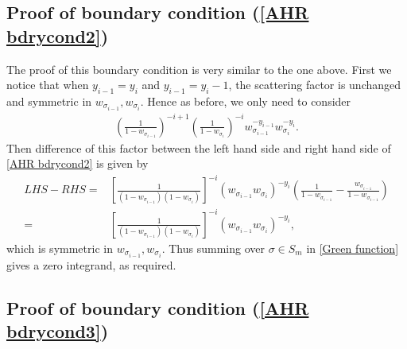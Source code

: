 \documentclass[cmp]{svjour}
\numberwithin{theorem}{section}
\numberwithin{equation}{section}
\begin{document}
\subsection{Proof of boundary condition (\ref{AHR bdrycond2})}

The proof of this boundary condition is very similar to the one above. First we notice that when $y_{i-1}=y_i$ and $y_{i-1}=y_i-1$, the scattering factor is unchanged and symmetric in $w_{\sigma_{i-1}},w_{\sigma_i}$. Hence as before, we only need to consider
\begin{align}
\label{AHR w component bdrycond}
\left(\frac{1}{1-w_{\sigma_{i-1}}}\right)^{-i+1}
\left(\frac{1}{1-w_{\sigma_i}}\right)^{-i}
w_{\sigma_{i-1}}^{-y_{i-1}}w_{\sigma_i}^{-y_i}.
\end{align}
Then difference of this factor between the left hand side and right hand side of \eqref{AHR bdrycond2} is given by
\begin{align*}
LHS-RHS
=&
\left[
\frac{1}{(1-w_{\sigma_{i-1}})
(1-w_{\sigma_i})}\right]^{-i}
(w_{\sigma_{i-1}}w_{\sigma_i})^{-y_i}
\left(
\frac{1}{1-w_{\sigma_{i-1}}}-
\frac{w_{\sigma_{i-1}}}{1-w_{\sigma_{i-1}}}
\right)\\
=&
\left[
\frac{1}{(1-w_{\sigma_{i-1}})
(1-w_{\sigma_i})}\right]^{-i}
(w_{\sigma_{i-1}}w_{\sigma_i})^{-y_i},
\end{align*}
which is symmetric in $w_{\sigma_{i-1}},w_{\sigma_i}$. Thus summing over $\sigma\in S_m$ in \eqref{Green function} gives a zero integrand, as required.

\subsection{Proof of boundary condition (\ref{AHR bdrycond3})}
\end{document}
